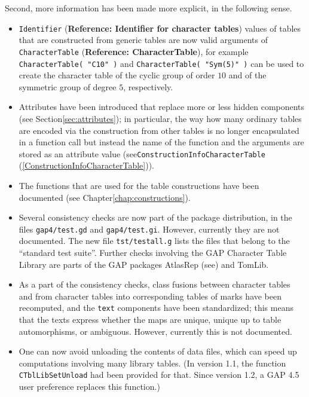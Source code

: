 \documentclass[a4paper,11pt]{report}
\begin{document}
{{{ Second, more information has been made more explicit, in the following sense. 
\begin{itemize}
\item  \texttt{Identifier} (\textbf{Reference: Identifier for character tables}) values of tables that are constructed from generic tables are now valid
arguments of \texttt{CharacterTable} (\textbf{Reference: CharacterTable}), for example \texttt{CharacterTable( "C10" )} and \texttt{CharacterTable( "Sym(5)" )} can be used to create the character table of the cyclic group of order $10$ and of the symmetric group of degree $5$, respectively. 
\item  Attributes have been introduced that replace more or less hidden components
(see Section{\nobreakspace}\ref{sec:attributes}); in particular, the way how many ordinary tables are encoded via the
construction from other tables is no longer encapsulated in a function call
but instead the name of the function and the arguments are stored as an
attribute value (see{\nobreakspace}\texttt{ConstructionInfoCharacterTable} (\ref{ConstructionInfoCharacterTable})). 
\item  The functions that are used for the table constructions have been documented
(see Chapter{\nobreakspace}\ref{chap:constructions}). 
\item  Several consistency checks are now part of the package distribution, in the
files \texttt{gap4/test.gd} and \texttt{gap4/test.gi}. However, currently they are not documented. The new file \texttt{tst/testall.g} lists the files that belong to the ``standard test suite''. Further checks involving the \textsf{GAP} Character Table Library are parts of the \textsf{GAP} packages AtlasRep (see{\nobreakspace}\cite{AtlasRep}) and TomLib. 
\item  As a part of the consistency checks, class fusions between character tables
and from character tables into corresponding tables of marks have been
recomputed, and the \texttt{text} components have been standardized; this means that the texts express whether
the maps are unique, unique up to table automorphisms, or ambiguous. However,
currently this is not documented. 
\item  One can now avoid unloading the contents of data files, which can speed up
computations involving many library tables. (In version 1.1, the function \texttt{CTblLibSetUnload} had been provided for that. Since version 1.2, a \textsf{GAP} 4.5 user preference replaces this function.) 
\end{itemize}
 

}}}
\end{document}
